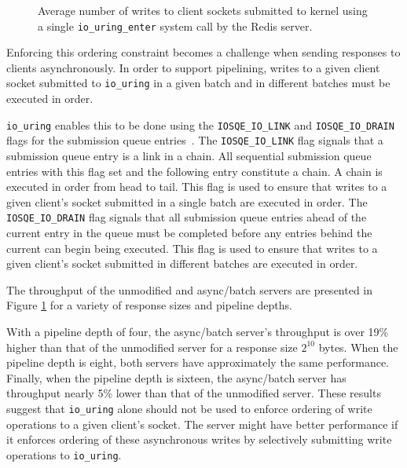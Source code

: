 \documentclass[sigconf]{acmart}
\newcommand{\inlinecode}[1]{\texttt{#1}}
\begin{document}
\begin{figure}[]
\caption{Average number of writes to client sockets submitted to kernel using a single \inlinecode{io\_uring\_enter} system call by the Redis server.}
\label{fig:pipelining}
\end{figure}

Enforcing this ordering constraint becomes a challenge when sending responses to clients asynchronously.
In order to support pipelining, writes to a given client socket submitted to \inlinecode{io\_uring} in a given batch and in different batches must be executed in order.

\inlinecode{io\_uring} enables this to be done using the \inlinecode{IOSQE\_IO\_LINK} and \inlinecode{IOSQE\_IO\_DRAIN} flags for the submission queue entries~\cite{iouring}.
The \inlinecode{IOSQE\_IO\_LINK} flag signals that a submission queue entry is a link in a chain.
All sequential submission queue entries with this flag set and the following entry constitute a chain.
A chain is executed in order from head to tail.
This flag is used to ensure that writes to a given client's socket submitted in a single batch are executed in order.
The \inlinecode{IOSQE\_IO\_DRAIN} flag signals that all submission queue entries ahead of the current entry in the queue must be completed before any entries behind the current can begin being executed.
This flag is used to ensure that writes to a given client's socket submitted in different batches are executed in order.

The throughput of the unmodified and async/batch servers are presented in Figure \ref{fig:pipelining} for a variety of response sizes and pipeline depths.

With a pipeline depth of four, the async/batch server's throughput is over 19\% higher than that of the unmodified server for a response size $2^{10}$ bytes.
When the pipeline depth is eight, both servers have approximately the same performance.
Finally, when the pipeline depth is sixteen, the async/batch server has throughput nearly 5\% lower than that of the unmodified server.
These results suggest that \inlinecode{io\_uring} alone should not be used to enforce ordering of write operations to a given client's socket.
The server might have better performance if it enforces ordering of these asynchronous writes by selectively submitting write operations to \inlinecode{io\_uring}.
\end{document}
